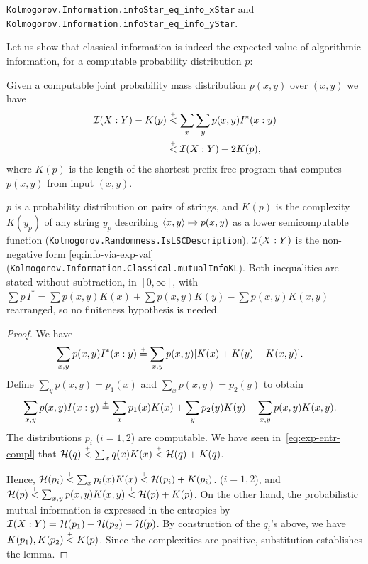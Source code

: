 \begin{formalization}
\texttt{Kolmogorov.Information.infoStar\_eq\_info\_xStar} and
\texttt{Kolmogorov.Information.infoStar\_eq\_info\_yStar}.
\end{formalization}

Let us show that classical information is indeed the expected value of
algorithmic information, for a computable probability distribution \( p \):

\begin{lemma}
  \label{lem:g3.1.10}
  \leanok
Given a computable joint probability mass distribution \( p(x,y) \) over \( (x,y) \)
we have 
\begin{align}\label{eq:eqamipmi}
\mathcal{I}(X : Y) - K(p) & \stackrel{{}_+}{<}  \sum_{x} \sum_y p(x,y) I^{*}(x : y) 
\\& \stackrel{{}_+}{<} \mathcal{I}(X : Y) + 2 K(p) , 
\nonumber
\end{align}
where \( K(p) \) is the length of the shortest prefix-free program that computes
\( p(x,y) \) from input \( (x,y) \).
\end{lemma}

\begin{formalization}
\( p \) is a probability distribution on pairs of strings, and \( K(p) \) is the complexity
\( K(y_{p}) \) of any string \( y_{p} \) describing \( {\mathopen\langle x, y\mathclose\rangle} \mapsto p(x, y) \) as a lower
semicomputable function (\texttt{Kolmogorov.Randomness.IsLSCDescription}). \( \mathcal{I}(X : Y) \)
is the non-negative form \eqref{eq:info-via-exp-val}
(\texttt{Kolmogorov.Information.Classical.mutualInfoKL}). Both inequalities are stated
without subtraction, in \( [0, \infty] \), with
\( \sum p\, I^{*} = \sum p(x,y) K(x) + \sum p(x,y) K(y) - \sum p(x,y) K(x,y) \) rearranged,
so no finiteness hypothesis is needed.
\end{formalization}

\begin{proof}
  \leanok
We have
\begin{align*}
\sum_{x,y} p(x,y) I^{*}(x : y) &\stackrel{{}_+}{=} 
\sum_{x,y} p(x, y)  [K(x) + K(y) - K(x, y)].
\end{align*}
 Define \( \sum_y p(x,y) = p_{1}(x) \) and \( \sum_{x} p(x,y) = p_{2}(y) \)
to obtain
\begin{align*}
\sum_{x,y} p(x,y) I(x:y) &\stackrel{{}_+}{=}
 \sum_{x} p_{1} (x) K(x) + \sum_y p_{2} (y) K(y) - \sum_{x,y} p(x,y) K(x, y).
\end{align*}
The distributions \( p_{i} \) (\( i=1,2 \)) are computable.
We have seen in~\eqref{eq:exp-entr-compl} that
\( \mathcal{H}(q) \stackrel{{}_+}{<} \sum_{x} q(x) K(x) \stackrel{{}_+}{<} \mathcal{H}(q) + K(q) \).

Hence, \( \mathcal{H}(p_{i}) \stackrel{{}_+}{<} \sum_{x} p_{i} (x) K(x) \stackrel{{}_+}{<} \mathcal{H}(p_{i}) + K(p_{i}) \).
(\( i=1,2 \)), and \( \mathcal{H}(p) \stackrel{{}_+}{<} \sum_{x,y} p(x,y) K(x,y) \stackrel{{}_+}{<} \mathcal{H}(p) + K(p) \).
On the other hand, the probabilistic mutual information
is expressed in the entropies by \( \mathcal{I}(X : Y) = \mathcal{H}(p_{1}) + \mathcal{H}(p_{2}) - \mathcal{H}(p) \).
By construction of the \( q_{i} \)'s above,
we have \( K(p_{1}), K(p_{2}) \stackrel{{}_+}{<} K(p) \). 
Since the complexities are positive, substitution establishes the lemma.
\end{proof}

